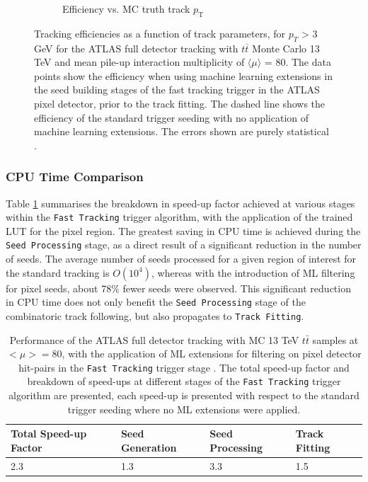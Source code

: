\begin{figure}[!htbp]
\begin{subfigure}[b]{0.86\textwidth}
        \caption{Efficiency vs. MC truth track $p_{\mathrm{T}}$}
    \end{subfigure}
\caption{Tracking efficiencies as a function of track parameters, for $p_{T}$ > 3 GeV for the ATLAS full detector tracking with $t\overline{t}$ Monte Carlo 13 TeV and mean pile-up interaction multiplicity of $\langle \mu \rangle$ = 80. The data points show the efficiency when using machine learning extensions in the seed building stages of the fast tracking trigger in the ATLAS pixel detector, prior to the track fitting. The dashed line shows the efficiency of the standard trigger seeding with no application of machine learning extensions. The errors shown are purely statistical \cite{public-hlt}. }
\label{fig:efficiencies-ml-hit-pair-predictor}
\end{figure}



\subsubsection{CPU Time Comparison}

Table \ref{tab:cpu} summarises the breakdown in speed-up factor achieved at various stages within the \texttt{Fast Tracking} trigger algorithm, with the application of the trained LUT for the pixel region. The greatest saving in CPU time is achieved during the \texttt{Seed Processing} stage, as a direct result of a significant reduction in the number of seeds. The average number of seeds processed for a given region of interest for the standard tracking is $O(10^{4})$, whereas with the introduction of ML filtering for pixel seeds, about 78\% fewer seeds were observed. This significant reduction in CPU time does not only benefit the \texttt{Seed Processing} stage of the combinatoric track following, but also propagates to \texttt{Track Fitting}.

\begin{table}[htb!]
\caption{Performance of the ATLAS full detector tracking with MC 13 TeV $t\bar{t}$ samples at $<\mu> = 80$, with the application of ML extensions for filtering on pixel detector hit-pairs in the \texttt{Fast Tracking} trigger stage \cite{public-hlt}. The total speed-up factor and breakdown of speed-ups at different stages of the \texttt{Fast Tracking} trigger algorithm are presented, each speed-up is presented with respect to the standard trigger seeding where no ML extensions were applied.}
\begin{center}
\begin{tabular}{llll}
\toprule
Total Speed-up Factor & Seed Generation & Seed Processing & Track Fitting \\
\hline
2.3 & 1.3 & 3.3 & 1.5 \\ 
\bottomrule
\end{tabular}
\end{center}
\label{tab:cpu}
\end{table}

